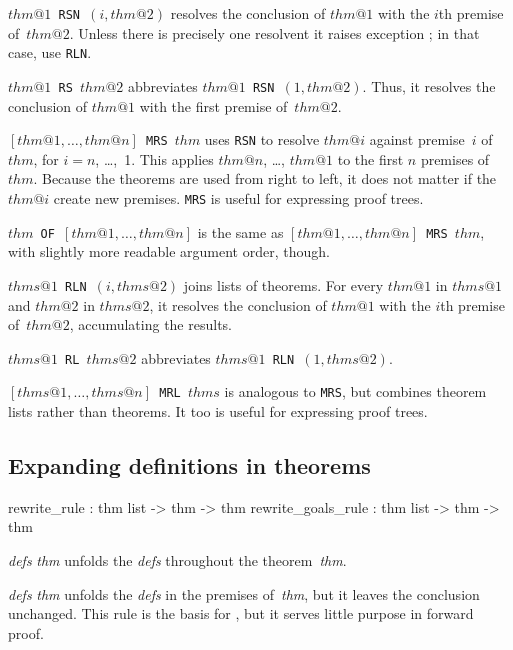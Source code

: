 \begin{ttdescription}
\item[\tt$thm@1$ RSN $(i,thm@2)$]  
  resolves the conclusion of $thm@1$ with the $i$th premise of~$thm@2$.
  Unless there is precisely one resolvent it raises exception
  ; in that case, use {\tt RLN}.

\item[\tt$thm@1$ RS $thm@2$]  
abbreviates \hbox{\tt$thm@1$ RSN $(1,thm@2)$}.  Thus, it resolves the
conclusion of $thm@1$ with the first premise of~$thm@2$.

\item[\tt {$[thm@1,\ldots,thm@n]$} MRS $thm$]  
  uses {\tt RSN} to resolve $thm@i$ against premise~$i$ of $thm$, for
  $i=n$, \ldots,~1.  This applies $thm@n$, \ldots, $thm@1$ to the first $n$
  premises of $thm$.  Because the theorems are used from right to left, it
  does not matter if the $thm@i$ create new premises.  {\tt MRS} is useful
  for expressing proof trees.
  
\item[\tt {$thm$ OF $[thm@1,\ldots,thm@n]$}]  is the same as
  \texttt{$[thm@1,\ldots,thm@n]$ MRS $thm$}, with slightly more readable
  argument order, though.

\item[\tt$thms@1$ RLN $(i,thms@2)$]  
  joins lists of theorems.  For every $thm@1$ in $thms@1$ and $thm@2$ in
  $thms@2$, it resolves the conclusion of $thm@1$ with the $i$th premise
  of~$thm@2$, accumulating the results. 

\item[\tt$thms@1$ RL $thms@2$]  
abbreviates \hbox{\tt$thms@1$ RLN $(1,thms@2)$}. 

\item[\tt {$[thms@1,\ldots,thms@n]$} MRL $thms$]  
is analogous to {\tt MRS}, but combines theorem lists rather than theorems.
It too is useful for expressing proof trees.
\end{ttdescription}


\subsection{Expanding definitions in theorems}
\begin{ttbox} 
rewrite_rule       : thm list -> thm -> thm
rewrite_goals_rule : thm list -> thm -> thm
\end{ttbox}
\begin{ttdescription}
\item[\ttindexbold{rewrite_rule} {\it defs} {\it thm}]  
unfolds the {\it defs} throughout the theorem~{\it thm}.

\item[\ttindexbold{rewrite_goals_rule} {\it defs} {\it thm}]  
unfolds the {\it defs} in the premises of~{\it thm}, but it leaves the
conclusion unchanged.  This rule is the basis for ,
but it serves little purpose in forward proof.
\end{ttdescription}


